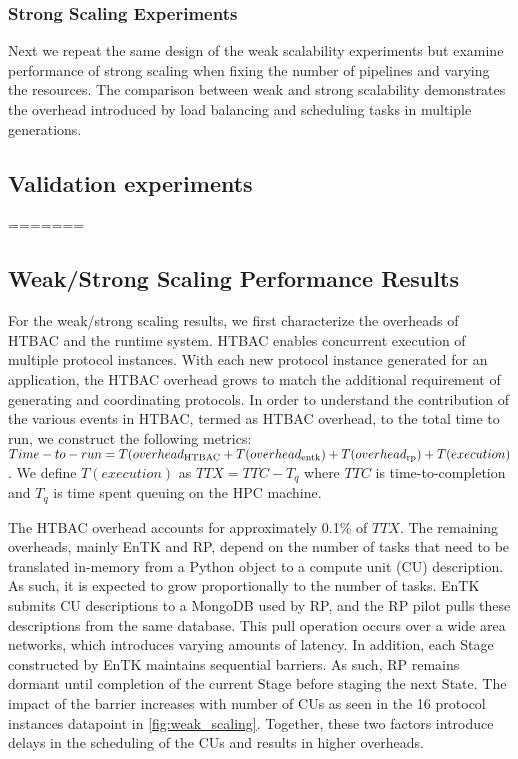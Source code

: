 \subsubsection {Strong Scaling Experiments}

Next we repeat the same design of the weak scalability
experiments but examine performance of strong scaling when fixing the number of
pipelines and varying the resources. The comparison between weak and strong
scalability demonstrates the overhead introduced by load balancing and
scheduling tasks in multiple generations.


\subsection{Validation experiments}
=======
\subsection{Weak/Strong Scaling Performance Results}

For the weak/strong scaling results, we first characterize the overheads of HTBAC and
the runtime system. HTBAC enables concurrent execution of multiple protocol instances.
With each new protocol instance generated for an
application, the HTBAC overhead grows to match the additional
requirement of generating and coordinating protocols. In order
to understand the contribution of the various events in HTBAC,
termed as HTBAC overhead, to the total time to run, we construct the following metrics:
\(Time-to-run = T(overhead\textsubscript{HTBAC} +
T(overhead\textsubscript{entk}) +
T(overhead\textsubscript{rp}) + T(execution)\). We define \(T(execution)\) as \(TTX = TTC - T_q\) where \(TTC\) is
time-to-completion and \(T_q\) is time spent queuing on the HPC machine.

The HTBAC overhead accounts for approximately 0.1\% of \(TTX\).
The remaining overheads, mainly EnTK and RP, depend on the number of tasks that need to be
translated in-memory from a Python object to a compute unit (CU) description. As such, it is
expected to grow proportionally to the number of tasks. EnTK submits CU descriptions to a
MongoDB used by RP, and the RP pilot pulls these descriptions from the same database.
This pull operation occurs over a wide area networks, which introduces varying amounts of latency.
In addition, each Stage constructed by EnTK maintains sequential barriers. As such, RP remains
dormant until completion of the current Stage before staging the next State. The impact of the 
barrier increases with number of CUs as seen in the 16 protocol instances datapoint 
in \ref{fig:weak_scaling}. 
Together, these two factors introduce delays in the scheduling of the CUs and results in 
higher overheads. 

